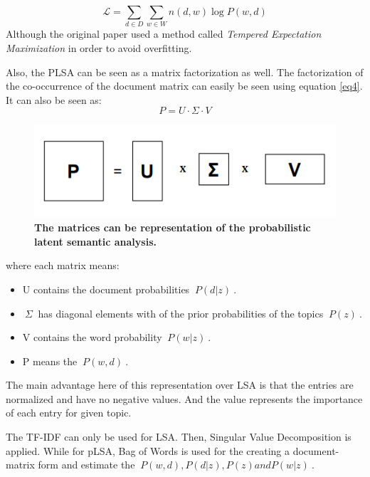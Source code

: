 \documentclass[12pt]{report}
\begin{document}
         \begin{equation}
             \mathcal{L} = \sum_{d \in D} \sum_{w \in W} n(d, w)  \log P(w, d)   
         \end{equation}
        Although the original paper \cite{hofmann2013probabilistic} used a method called 
        \emph{Tempered Expectation Maximization} in order to avoid overfitting.
        
        Also, the PLSA can be seen as a matrix factorization as well. The factorization of the co-occurrence of the 
        document matrix can easily be seen using equation \ref{eq4}. It can also be seen as:
        \begin{equation}\label{eq10}
            P = U \cdot \Sigma \cdot V
        \end{equation}
        \begin{figure}[h]
            \centering
            \includegraphics[scale=0.8]{plsa.png}
            \caption{\textbf{The matrices can be representation of the probabilistic latent semantic analysis.}}
        \end{figure}
        where each matrix means:
        \begin{itemize}
            \item U contains the document probabilities $~{P(d|z)}~$.
            \item $~{\Sigma}~$ has diagonal elements with of the prior probabilities of the 
            topics $~{P(z)}~$.
            \item V contains the word probability $~{P(w|z)}~$.
            \item P means the $~{P(w,d)}~$.  
        \end{itemize}
        
        The main advantage here of this representation over LSA is that the entries are normalized and 
        have no negative values. And the value represents the importance of each entry for given topic.
        
               
        
        
        The TF-IDF can only be used for LSA. Then, Singular Value Decomposition is applied. 
        While for pLSA, Bag of Words is used for the creating a document-matrix form and estimate the $~{P(w, d), P(d|z), P(z) and P(w|z)}~$. 
\end{document}
